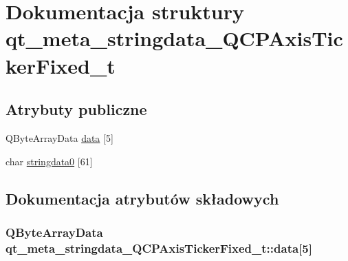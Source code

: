 \hypertarget{structqt__meta__stringdata___q_c_p_axis_ticker_fixed__t}{}\section{Dokumentacja struktury qt\+\_\+meta\+\_\+stringdata\+\_\+\+Q\+C\+P\+Axis\+Ticker\+Fixed\+\_\+t}
\label{structqt__meta__stringdata___q_c_p_axis_ticker_fixed__t}
\subsection*{Atrybuty publiczne}
\begin{DoxyCompactItemize}
\item 
Q\+Byte\+Array\+Data \hyperlink{structqt__meta__stringdata___q_c_p_axis_ticker_fixed__t_a6a154326b81876525a18cc787d72999a}{data} \mbox{[}5\mbox{]}
\item 
char \hyperlink{structqt__meta__stringdata___q_c_p_axis_ticker_fixed__t_a4624793f0a8202895228fd43a030e135}{stringdata0} \mbox{[}61\mbox{]}
\end{DoxyCompactItemize}


\subsection{Dokumentacja atrybutów składowych}
\subsubsection[{\texorpdfstring{data}{data}}]{\setlength{\rightskip}{0pt plus 5cm}Q\+Byte\+Array\+Data qt\+\_\+meta\+\_\+stringdata\+\_\+\+Q\+C\+P\+Axis\+Ticker\+Fixed\+\_\+t\+::data\mbox{[}5\mbox{]}}\hypertarget{structqt__meta__stringdata___q_c_p_axis_ticker_fixed__t_a6a154326b81876525a18cc787d72999a}{}\label{structqt__meta__stringdata___q_c_p_axis_ticker_fixed__t_a6a154326b81876525a18cc787d72999a}
